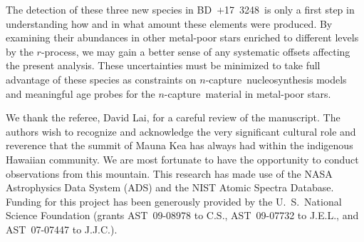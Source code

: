 \documentclass{emulateapj}
\def\bd{\mbox{BD~$+$17~3248}}
\def\rpro{\mbox{$r$-process}}
\def\ncap{\mbox{$n$-capture}}
\begin{document}
The detection of these three new species in \bd\ is only
a first step in understanding how and in what amount 
these elements were produced.
By examining their abundances in other
metal-poor stars enriched to different levels by the \rpro, we may
gain a better sense of any systematic offsets 
affecting the present analysis.
These uncertainties must be minimized to take full advantage
of these species as constraints on \ncap\ nucleosynthesis models
and meaningful age probes for the \ncap\ material in metal-poor stars.


\acknowledgments


We thank the referee, David Lai, for a careful review of the manuscript.
The authors wish to recognize and acknowledge the very significant 
cultural role and reverence that the summit of Mauna Kea has always 
had within the indigenous Hawaiian community.  We are most fortunate 
to have the opportunity to conduct observations from this mountain.
This research has made use of the 
NASA Astrophysics Data System (ADS) and the
NIST Atomic Spectra Database.
Funding for this project has been generously provided by 
the U.~S.\ National Science Foundation
(grants AST~09-08978 to C.S., 
AST~09-07732 to J.E.L., and 
AST~07-07447 to J.J.C.).



\end{document}
